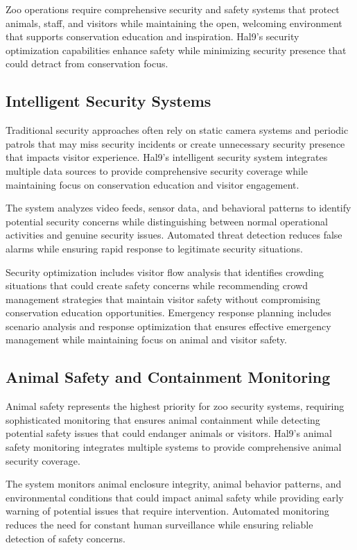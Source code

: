 \documentclass[
  Letterpaper,
]{scrbook}
\begin{document}
Zoo operations require comprehensive security and safety systems that
protect animals, staff, and visitors while maintaining the open,
welcoming environment that supports conservation education and
inspiration. Hal9's security optimization capabilities enhance safety
while minimizing security presence that could detract from conservation
focus.

\subsection{Intelligent Security
Systems}\label{intelligent-security-systems}

Traditional security approaches often rely on static camera systems and
periodic patrols that may miss security incidents or create unnecessary
security presence that impacts visitor experience. Hal9's intelligent
security system integrates multiple data sources to provide
comprehensive security coverage while maintaining focus on conservation
education and visitor engagement.

The system analyzes video feeds, sensor data, and behavioral patterns to
identify potential security concerns while distinguishing between normal
operational activities and genuine security issues. Automated threat
detection reduces false alarms while ensuring rapid response to
legitimate security situations.

Security optimization includes visitor flow analysis that identifies
crowding situations that could create safety concerns while recommending
crowd management strategies that maintain visitor safety without
compromising conservation education opportunities. Emergency response
planning includes scenario analysis and response optimization that
ensures effective emergency management while maintaining focus on animal
and visitor safety.

\subsection{Animal Safety and Containment
Monitoring}\label{animal-safety-and-containment-monitoring}

Animal safety represents the highest priority for zoo security systems,
requiring sophisticated monitoring that ensures animal containment while
detecting potential safety issues that could endanger animals or
visitors. Hal9's animal safety monitoring integrates multiple systems to
provide comprehensive animal security coverage.

The system monitors animal enclosure integrity, animal behavior
patterns, and environmental conditions that could impact animal safety
while providing early warning of potential issues that require
intervention. Automated monitoring reduces the need for constant human
surveillance while ensuring reliable detection of safety concerns.
\end{document}
